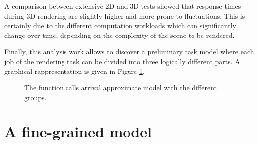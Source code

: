 A comparison between extensive 2D and 3D tests showed that response times
during 3D rendering are slightly higher and more prone to fluctuations. This is
certainly due to the different computation workloads which can significantly change
over time, depending on the complexity of the scene to be rendered.

Finally, this analysis work allows to discover a preliminary task model where
each job of the rendering task can be divided into three logically different
parts. A graphical rappresentation is given in Figure \ref{img:call_arrival}.

\begin{figure}[!htb]
    \caption{The function calls arrival approximate model with the different groups.}
    \label{img:call_arrival}
\end{figure}


\section{A fine-grained model}

